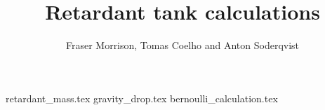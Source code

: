 \documentclass{report}
\author{Fraser Morrison, Tomas Coelho and Anton Soderqvist}
\title{Retardant tank calculations}
\begin{document}
\maketitle
\setcounter{tocdepth}{3}
\tableofcontents

{retardant_mass.tex}
{gravity_drop.tex}
{bernoulli_calculation.tex}






\end{document}
